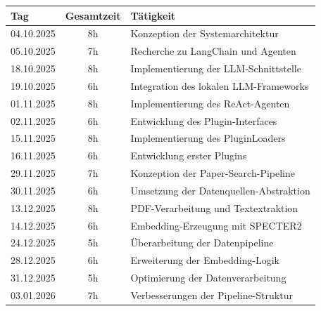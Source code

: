 \begin{table}[H]
	\centering
	\scriptsize
	\begin{tabular}{|l|c|p{8.5cm}|}
		\hline
		Tag                                        & Gesamtzeit    & Tätigkeit                               \\
		\hline
		04.10.2025                                 & 8h            & Konzeption der Systemarchitektur        \\
		05.10.2025                                 & 7h            & Recherche zu LangChain und Agenten      \\
		18.10.2025                                 & 8h            & Implementierung der LLM-Schnittstelle   \\
		19.10.2025                                 & 6h            & Integration des lokalen LLM-Frameworks  \\
		01.11.2025                                 & 8h            & Implementierung des ReAct-Agenten       \\
		02.11.2025                                 & 6h            & Entwicklung des Plugin-Interfaces       \\
		15.11.2025                                 & 8h            & Implementierung des PluginLoaders       \\
		16.11.2025                                 & 6h            & Entwicklung erster Plugins              \\
		29.11.2025                                 & 7h            & Konzeption der Paper-Search-Pipeline    \\
		30.11.2025                                 & 6h            & Umsetzung der Datenquellen-Abstraktion  \\
		13.12.2025                                 & 8h            & PDF-Verarbeitung und Textextraktion     \\
		14.12.2025                                 & 6h            & Embedding-Erzeugung mit SPECTER2        \\
		24.12.2025                                 & 5h            & Überarbeitung der Datenpipeline         \\
		28.12.2025                                 & 6h            & Erweiterung der Embedding-Logik         \\
		31.12.2025                                 & 5h            & Optimierung der Datenverarbeitung       \\
		03.01.2026                                 & 7h            & Verbesserungen der Pipeline-Struktur    \\

\end{tabular}
\end{table}
